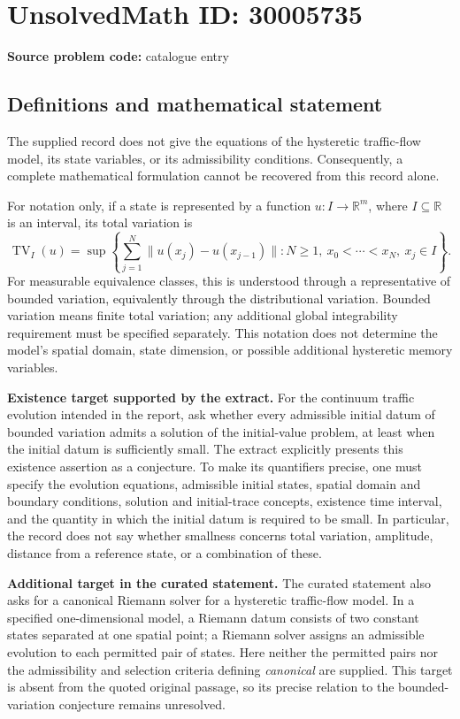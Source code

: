 \documentclass[11pt]{article}
\newcommand{\R}{\mathbb{R}}
\begin{document}
\section*{UnsolvedMath ID: 30005735}
\textbf{Source problem code:} catalogue entry
\subsection{Definitions and mathematical statement}
The supplied record does not give the equations of the hysteretic traffic-flow model, its state variables, or its admissibility conditions. Consequently, a complete mathematical formulation cannot be recovered from this record alone.

For notation only, if a state is represented by a function \(u:I\to\R^m\), where \(I\subseteq\R\) is an interval, its total variation is
\[
\operatorname{TV}_I(u)=\sup\left\{\sum_{j=1}^{N}\lVert u(x_j)-u(x_{j-1})\rVert: N\geq1,\ x_0<\cdots<x_N,\ x_j\in I\right\}.
\]
For measurable equivalence classes, this is understood through a representative of bounded variation, equivalently through the distributional variation. Bounded variation means finite total variation; any additional global integrability requirement must be specified separately. This notation does not determine the model's spatial domain, state dimension, or possible additional hysteretic memory variables.

\textbf{Existence target supported by the extract.} For the continuum traffic evolution intended in the report, ask whether every admissible initial datum of bounded variation admits a solution of the initial-value problem, at least when the initial datum is sufficiently small. The extract explicitly presents this existence assertion as a conjecture. To make its quantifiers precise, one must specify the evolution equations, admissible initial states, spatial domain and boundary conditions, solution and initial-trace concepts, existence time interval, and the quantity in which the initial datum is required to be small. In particular, the record does not say whether smallness concerns total variation, amplitude, distance from a reference state, or a combination of these.

\textbf{Additional target in the curated statement.} The curated statement also asks for a canonical Riemann solver for a hysteretic traffic-flow model. In a specified one-dimensional model, a Riemann datum consists of two constant states separated at one spatial point; a Riemann solver assigns an admissible evolution to each permitted pair of states. Here neither the permitted pairs nor the admissibility and selection criteria defining \emph{canonical} are supplied. This target is absent from the quoted original passage, so its precise relation to the bounded-variation conjecture remains unresolved.
\end{document}
